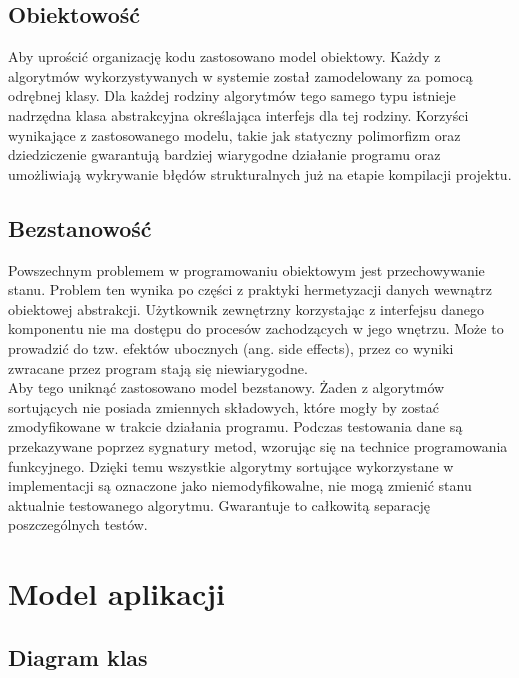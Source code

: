 \subsection{Obiektowość}
Aby uprościć organizację kodu zastosowano model obiektowy. Każdy z algorytmów wykorzystywanych w systemie
został zamodelowany za pomocą odrębnej klasy. Dla każdej rodziny algorytmów tego samego typu istnieje
nadrzędna klasa abstrakcyjna określająca interfejs dla tej rodziny. Korzyści wynikające z zastosowanego
modelu, takie jak statyczny polimorfizm oraz dziedziczenie gwarantują bardziej wiarygodne działanie programu
oraz umożliwiają wykrywanie błędów strukturalnych już na etapie kompilacji projektu.

\subsection{Bezstanowość}
Powszechnym problemem w programowaniu obiektowym jest przechowywanie stanu. Problem ten wynika po części
z praktyki hermetyzacji danych wewnątrz obiektowej abstrakcji. Użytkownik zewnętrzny korzystając z interfejsu
danego komponentu nie ma dostępu do procesów zachodzących w jego wnętrzu. Może to prowadzić do tzw. efektów
ubocznych (ang. side effects), przez co wyniki zwracane przez program stają się niewiarygodne.\\

Aby tego uniknąć zastosowano model bezstanowy. Żaden z algorytmów sortujących nie posiada zmiennych składowych,
które mogły by zostać zmodyfikowane w trakcie działania programu. Podczas testowania dane są przekazywane
poprzez sygnatury metod, wzorując się na technice programowania funkcyjnego. Dzięki temu wszystkie algorytmy
sortujące wykorzystane w implementacji są oznaczone jako niemodyfikowalne, nie mogą zmienić stanu aktualnie
testowanego algorytmu. Gwarantuje to całkowitą separację poszczególnych testów.

\section{Model aplikacji}

\subsection{Diagram klas}

\begin{figure}[H]
	\centering
	
\end{figure}

